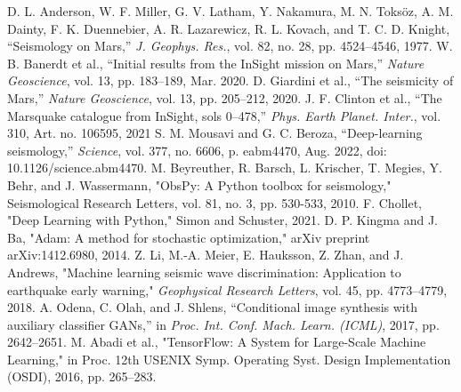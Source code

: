 \documentclass[conference]{IEEEtran}
\begin{document}
\begin{thebibliography}{00}
     D. L. Anderson, W. F. Miller, G. V. Latham, Y. Nakamura, M. N. Toksöz, A. M. Dainty, F. K. Duennebier, A. R. Lazarewicz, R. L. Kovach, and T. C. D. Knight, ``Seismology on Mars,'' \emph{J. Geophys. Res.}, vol. 82, no. 28, pp. 4524--4546, 1977.
     W. B. Banerdt et al., ``Initial results from the InSight mission on Mars,'' \emph{Nature Geoscience}, vol. 13, pp. 183--189, Mar. 2020.
     D. Giardini et al., ``The seismicity of Mars,'' \emph{Nature Geoscience}, vol. 13, pp. 205--212, 2020.
     J. F. Clinton et al., ``The Marsquake catalogue from InSight, sols 0--478,'' \emph{Phys. Earth Planet. Inter.}, vol. 310, Art. no. 106595, 2021
     S. M. Mousavi and G. C. Beroza, ``Deep-learning seismology,'' \emph{Science}, vol. 377, no. 6606, p. eabm4470, Aug. 2022, doi: 10.1126/science.abm4470.   
     M. Beyreuther, R. Barsch, L. Krischer, T. Megies, Y. Behr, and J. Wassermann, "ObsPy: A Python toolbox for seismology," Seismological Research Letters, vol. 81, no. 3, pp. 530-533, 2010.
     F. Chollet, "Deep Learning with Python," Simon and Schuster, 2021.
     D. P. Kingma and J. Ba, "Adam: A method for stochastic optimization," arXiv preprint arXiv:1412.6980, 2014.
     Z. Li, M.-A. Meier, E. Hauksson, Z. Zhan, and J. Andrews, "Machine learning seismic wave discrimination: Application to earthquake early warning," \emph{Geophysical Research Letters}, vol. 45, pp. 4773–4779, 2018.
     A. Odena, C. Olah, and J. Shlens, ``Conditional image synthesis with auxiliary classifier GANs,'' in \emph{Proc. Int. Conf. Mach. Learn. (ICML)}, 2017, pp. 2642--2651.
     M. Abadi et al., "TensorFlow: A System for Large-Scale Machine Learning," in Proc. 12th USENIX Symp. Operating Syst. Design Implementation (OSDI), 2016, pp. 265--283.

\end{thebibliography}
\end{document}
